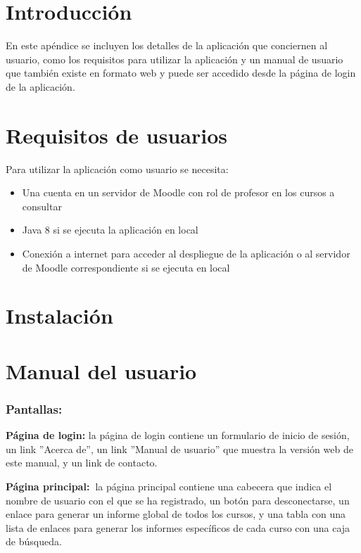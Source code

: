 
\section{Introducción}
En este apéndice se incluyen los detalles de la aplicación que conciernen al usuario, como los requisitos para utilizar la aplicación y un manual de usuario que también existe en formato web y puede ser accedido desde la página de login de la aplicación.
\section{Requisitos de usuarios}
Para utilizar la aplicación como usuario se necesita:
\begin{itemize}
	\item Una cuenta en un servidor de Moodle con rol de profesor en los cursos a consultar
	\item Java 8 si se ejecuta la aplicación en local
	\item Conexión a internet para acceder al despliegue de la aplicación o al servidor de Moodle correspondiente si se ejecuta en local
\end{itemize}
\section{Instalación}

\section{Manual del usuario}

\subsubsection{Pantallas:}

\textbf{Página de login:} la página de login contiene un formulario de
inicio de sesión, un link ''Acerca de'', un link ''Manual de usuario'' que
muestra la versión web de este manual, y un link de contacto.

\textbf{Página principal:~}la página principal contiene una cabecera que
indica el nombre de usuario con el que se ha registrado, un botón para
desconectarse, un enlace para generar un informe global de todos los
cursos, y una tabla con una lista de enlaces para generar los informes
específicos de cada curso con una caja de búsqueda.

